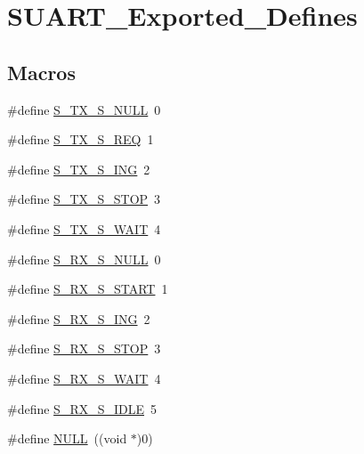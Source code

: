 \hypertarget{group___s_u_a_r_t___exported___defines}{}\section{S\+U\+A\+R\+T\+\_\+\+Exported\+\_\+\+Defines}
\label{group___s_u_a_r_t___exported___defines}
\subsection*{Macros}
\begin{DoxyCompactItemize}
\item 
\#define \mbox{\hyperlink{group___s_u_a_r_t___exported___defines_gaea373353179cdbcc8a9b1293edbd4932}{S\+\_\+\+T\+X\+\_\+\+S\+\_\+\+N\+U\+LL}}~0
\item 
\#define \mbox{\hyperlink{group___s_u_a_r_t___exported___defines_ga57dce3ade77c94e32d99ba1f164a6a3a}{S\+\_\+\+T\+X\+\_\+\+S\+\_\+\+R\+EQ}}~1
\item 
\#define \mbox{\hyperlink{group___s_u_a_r_t___exported___defines_ga84fe92c64968058d383184fc5367cb74}{S\+\_\+\+T\+X\+\_\+\+S\+\_\+\+I\+NG}}~2
\item 
\#define \mbox{\hyperlink{group___s_u_a_r_t___exported___defines_gae3f8830c218398d8567e3b53c8b09e6e}{S\+\_\+\+T\+X\+\_\+\+S\+\_\+\+S\+T\+OP}}~3
\item 
\#define \mbox{\hyperlink{group___s_u_a_r_t___exported___defines_ga42963e98a09cb8072a06f39b32f79a4d}{S\+\_\+\+T\+X\+\_\+\+S\+\_\+\+W\+A\+IT}}~4
\item 
\#define \mbox{\hyperlink{group___s_u_a_r_t___exported___defines_ga7b0fd6f9d6d235df0a71ae2e1a1277b6}{S\+\_\+\+R\+X\+\_\+\+S\+\_\+\+N\+U\+LL}}~0
\item 
\#define \mbox{\hyperlink{group___s_u_a_r_t___exported___defines_gaa319b4bfa61f71bb997013eb2de3eee4}{S\+\_\+\+R\+X\+\_\+\+S\+\_\+\+S\+T\+A\+RT}}~1
\item 
\#define \mbox{\hyperlink{group___s_u_a_r_t___exported___defines_ga23061086cd3c27746726d9a21801339a}{S\+\_\+\+R\+X\+\_\+\+S\+\_\+\+I\+NG}}~2
\item 
\#define \mbox{\hyperlink{group___s_u_a_r_t___exported___defines_ga4bababb18ccb91dfab9c8cfb4ec1e44b}{S\+\_\+\+R\+X\+\_\+\+S\+\_\+\+S\+T\+OP}}~3
\item 
\#define \mbox{\hyperlink{group___s_u_a_r_t___exported___defines_ga3a9d6e867fa3589654b1c4f1a315cccc}{S\+\_\+\+R\+X\+\_\+\+S\+\_\+\+W\+A\+IT}}~4
\item 
\#define \mbox{\hyperlink{group___s_u_a_r_t___exported___defines_ga2db399723e5461caf044ee118e824203}{S\+\_\+\+R\+X\+\_\+\+S\+\_\+\+I\+D\+LE}}~5
\item 
\#define \mbox{\hyperlink{group___s_u_a_r_t___exported___defines_ga070d2ce7b6bb7e5c05602aa8c308d0c4}{N\+U\+LL}}~((void $\ast$)0)
\end{DoxyCompactItemize}


